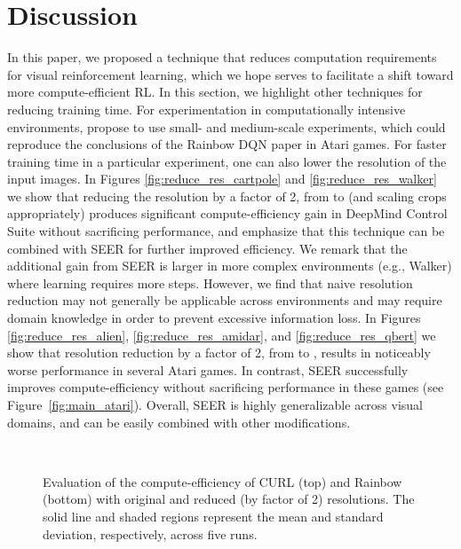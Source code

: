 \documentclass{article}
\begin{document}
\section{Discussion} \label{discussion}
In this paper, we proposed a technique that reduces computation requirements for visual reinforcement learning, which we hope serves to facilitate a shift toward more compute-efficient RL. In this section, we highlight other techniques for reducing training time. For experimentation in computationally intensive environments, \citet{obando2020revisiting} propose to use small- and medium-scale experiments, which could reproduce the conclusions of the Rainbow DQN paper in Atari games. For faster training time in a particular experiment, one can also lower the resolution of the input images. In Figures \ref{fig:reduce_res_cartpole} and \ref{fig:reduce_res_walker} we show that reducing the resolution by a factor of 2, from  to  (and scaling crops appropriately) produces significant compute-efficiency gain in DeepMind Control Suite without sacrificing performance, and emphasize that this technique can be combined with SEER for further improved efficiency. We remark that the additional gain from SEER is larger in more complex environments (e.g., Walker) where learning requires more steps. However, we find that naive resolution reduction may not generally be applicable across environments and may require domain knowledge in order to prevent excessive information loss. In Figures \ref{fig:reduce_res_alien}, \ref{fig:reduce_res_amidar}, and \ref{fig:reduce_res_qbert} we show that resolution reduction by a factor of 2, from  to , results in noticeably worse performance in several Atari games. In contrast, SEER successfully improves compute-efficiency without sacrificing performance in these games (see Figure~\ref{fig:main_atari}). Overall, SEER is highly generalizable across visual domains, and can be easily combined with other modifications.

\begin{figure*} [t] \centering
{} 
\\
\caption{Evaluation of the compute-efficiency of CURL (top) and Rainbow (bottom) with original and reduced (by factor of 2) resolutions. The solid line and shaded regions represent the mean and standard deviation, respectively, across five runs.} \label{fig:reduce_res_results}
\end{figure*}
\end{document}
